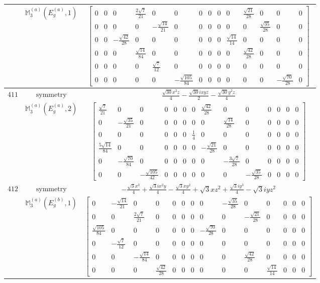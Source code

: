\documentclass[fleqn,8pt,landscape]{jsarticle}
\begin{document}
\begin{longtable}{ccc}
$  $ & $ \mathbb{M}_{3}^{(a)}(E_{g}^{(a)},1) $ & $ \begin{bmatrix} 0 & 0 & 0 & \frac{2 \sqrt{7}}{21} & 0 & 0 & 0 & 0 & 0 & 0 & \frac{\sqrt{21}}{28} & 0 & 0 & 0 \\ 0 & 0 & 0 & 0 & - \frac{\sqrt{14}}{21} & 0 & 0 & 0 & 0 & 0 & 0 & \frac{\sqrt{35}}{28} & 0 & 0 \\ 0 & 0 & - \frac{\sqrt{42}}{28} & 0 & 0 & 0 & 0 & 0 & 0 & \frac{\sqrt{14}}{14} & 0 & 0 & 0 & 0 \\ 0 & 0 & 0 & \frac{\sqrt{14}}{84} & 0 & 0 & 0 & 0 & 0 & 0 & \frac{\sqrt{42}}{28} & 0 & 0 & 0 \\ 0 & 0 & 0 & 0 & \frac{\sqrt{7}}{12} & 0 & 0 & 0 & 0 & 0 & 0 & 0 & 0 & 0 \\ 0 & 0 & 0 & 0 & 0 & - \frac{\sqrt{105}}{84} & 0 & 0 & 0 & 0 & 0 & 0 & - \frac{\sqrt{70}}{28} & 0 \end{bmatrix} $ \\ \hline
$ 411 $ & $ \text{symmetry} $ & $ \frac{\sqrt{30} x^{2} z}{4} - \frac{\sqrt{30} i x y z}{2} - \frac{\sqrt{30} y^{2} z}{4} $ \\
$  $ & $ \mathbb{M}_{3}^{(a)}(E_{g}^{(a)},2) $ & $ \begin{bmatrix} \frac{\sqrt{7}}{21} & 0 & 0 & 0 & 0 & 0 & 0 & \frac{\sqrt{42}}{28} & 0 & 0 & 0 & 0 & 0 & 0 \\ 0 & - \frac{\sqrt{35}}{21} & 0 & 0 & 0 & 0 & 0 & 0 & \frac{\sqrt{14}}{28} & 0 & 0 & 0 & 0 & 0 \\ 0 & 0 & 0 & 0 & 0 & 0 & \frac{1}{4} & 0 & 0 & 0 & 0 & 0 & 0 & 0 \\ \frac{5 \sqrt{14}}{84} & 0 & 0 & 0 & 0 & 0 & 0 & - \frac{\sqrt{21}}{28} & 0 & 0 & 0 & 0 & 0 & 0 \\ 0 & - \frac{\sqrt{70}}{84} & 0 & 0 & 0 & 0 & 0 & 0 & - \frac{3 \sqrt{7}}{28} & 0 & 0 & 0 & 0 & 0 \\ 0 & 0 & - \frac{\sqrt{105}}{42} & 0 & 0 & 0 & 0 & 0 & 0 & - \frac{\sqrt{35}}{28} & 0 & 0 & 0 & 0 \end{bmatrix} $ \\ \hline
$ 412 $ & $ \text{symmetry} $ & $ - \frac{\sqrt{3} x^{3}}{4} + \frac{\sqrt{3} i x^{2} y}{4} - \frac{\sqrt{3} x y^{2}}{4} + \sqrt{3} x z^{2} + \frac{\sqrt{3} i y^{3}}{4} - \sqrt{3} i y z^{2} $ \\
$  $ & $ \mathbb{M}_{3}^{(a)}(E_{g}^{(b)},1) $ & $ \begin{bmatrix} 0 & - \frac{\sqrt{14}}{21} & 0 & 0 & 0 & 0 & 0 & 0 & - \frac{\sqrt{35}}{28} & 0 & 0 & 0 & 0 & 0 \\ 0 & 0 & \frac{2 \sqrt{7}}{21} & 0 & 0 & 0 & 0 & 0 & 0 & - \frac{\sqrt{21}}{28} & 0 & 0 & 0 & 0 \\ \frac{\sqrt{105}}{84} & 0 & 0 & 0 & 0 & 0 & 0 & - \frac{\sqrt{70}}{28} & 0 & 0 & 0 & 0 & 0 & 0 \\ 0 & - \frac{\sqrt{7}}{12} & 0 & 0 & 0 & 0 & 0 & 0 & 0 & 0 & 0 & 0 & 0 & 0 \\ 0 & 0 & - \frac{\sqrt{14}}{84} & 0 & 0 & 0 & 0 & 0 & 0 & \frac{\sqrt{42}}{28} & 0 & 0 & 0 & 0 \\ 0 & 0 & 0 & \frac{\sqrt{42}}{28} & 0 & 0 & 0 & 0 & 0 & 0 & \frac{\sqrt{14}}{14} & 0 & 0 & 0 \end{bmatrix} $ \\ \hline

\end{longtable}
\end{document}
